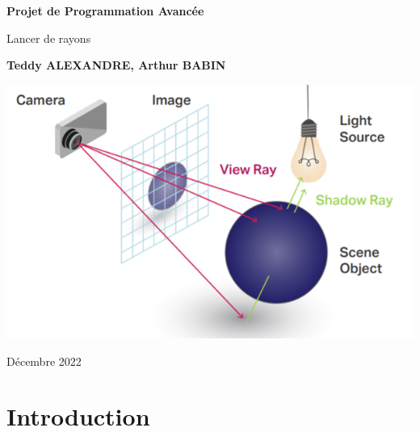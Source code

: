 \documentclass[a4paper,oneside,12pt,titlepage]{article}
\begin{document}
\begin{titlepage}
    \begin{center}
        \vspace*{1cm}
            
        \Huge
        \textbf{Projet de Programmation Avancée}
            
        \vspace{0.5cm}
        \LARGE
        Lancer de rayons
            
        \vspace{1.5cm}
            
        \textbf{Teddy ALEXANDRE, Arthur BABIN}
            
        \vfill
            
        \vspace{0.8cm}
            
        \includegraphics[width=\textwidth]{./raytracing_picture.png}

        \vfill
        \Large
        Décembre 2022
            
    \end{center}
\end{titlepage}

\tableofcontents
\newpage

\section{Introduction}
\end{document}
